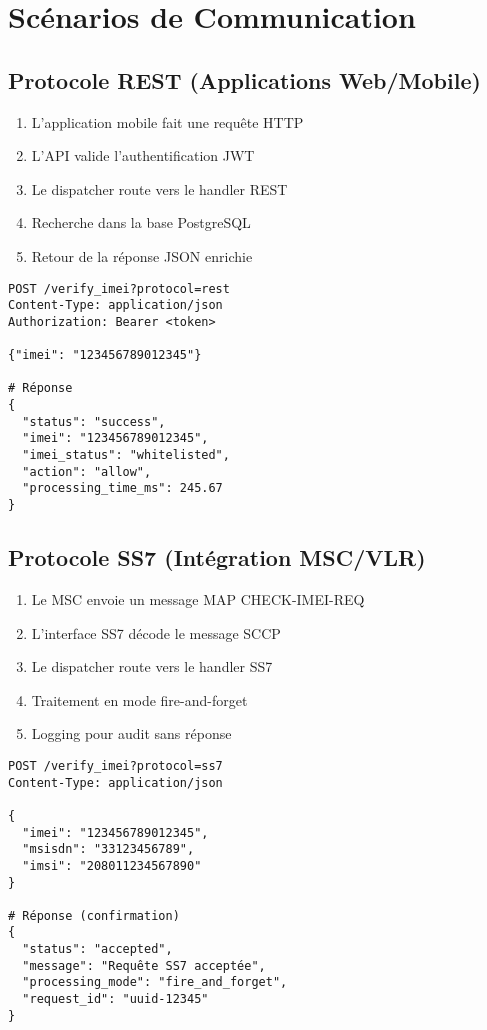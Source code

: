 \documentclass[11pt]{article}
\begin{document}
\section{Scénarios de Communication}

\subsection{Protocole REST (Applications Web/Mobile)}

\begin{enumerate}
    \item L'application mobile fait une requête HTTP
    \item L'API valide l'authentification JWT
    \item Le dispatcher route vers le handler REST
    \item Recherche dans la base PostgreSQL
    \item Retour de la réponse JSON enrichie
\end{enumerate}

\begin{lstlisting}[caption=Exemple REST]
POST /verify_imei?protocol=rest
Content-Type: application/json
Authorization: Bearer <token>

{"imei": "123456789012345"}

# Réponse
{
  "status": "success",
  "imei": "123456789012345",
  "imei_status": "whitelisted",
  "action": "allow",
  "processing_time_ms": 245.67
}
\end{lstlisting}

\subsection{Protocole SS7 (Intégration MSC/VLR)}

\begin{enumerate}
    \item Le MSC envoie un message MAP CHECK-IMEI-REQ
    \item L'interface SS7 décode le message SCCP
    \item Le dispatcher route vers le handler SS7
    \item Traitement en mode fire-and-forget
    \item Logging pour audit sans réponse
\end{enumerate}

\begin{lstlisting}[caption=Exemple SS7]
POST /verify_imei?protocol=ss7
Content-Type: application/json

{
  "imei": "123456789012345",
  "msisdn": "33123456789",
  "imsi": "208011234567890"
}

# Réponse (confirmation)
{
  "status": "accepted",
  "message": "Requête SS7 acceptée",
  "processing_mode": "fire_and_forget",
  "request_id": "uuid-12345"
}
\end{lstlisting}
\end{document}
